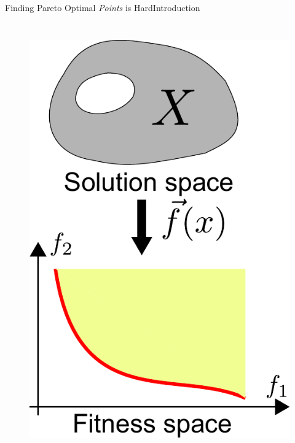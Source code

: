 \begin{frame}{Finding Pareto Optimal {\em Points} is Hard}{Introduction}
\begin{columns}
	\begin{figure}
		\centering
		\includegraphics[width=\linewidth]{figure/MOO_point}
		\label{fig:point_solution_space}
	\end{figure}
\end{columns}
\end{frame}




